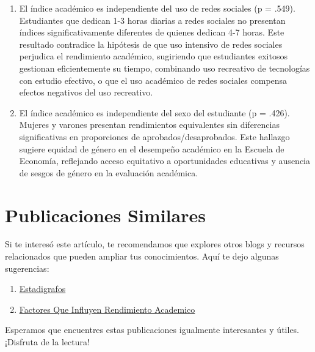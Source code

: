 \documentclass[
  stu,
  floatsintext,
  longtable,
  a4paper,
  nolmodern,
  notxfonts,
  notimes,
  12pt,
  colorlinks=true,linkcolor=blue,citecolor=blue,urlcolor=blue]{apa7}
\providecommand{\tightlist}{%
  \setlength{\itemsep}{0pt}\setlength{\parskip}{0pt}}
\begin{document}
\begin{enumerate}
  trayectorias exitosas.
\item
  El índice académico es independiente del uso de redes sociales (p =
  .549). Estudiantes que dedican 1-3 horas diarias a redes sociales no
  presentan índices significativamente diferentes de quienes dedican 4-7
  horas. Este resultado contradice la hipótesis de que uso intensivo de
  redes sociales perjudica el rendimiento académico, sugiriendo que
  estudiantes exitosos gestionan eficientemente su tiempo, combinando
  uso recreativo de tecnologías con estudio efectivo, o que el uso
  académico de redes sociales compensa efectos negativos del uso
  recreativo.
\item
  El índice académico es independiente del sexo del estudiante (p =
  .426). Mujeres y varones presentan rendimientos equivalentes sin
  diferencias significativas en proporciones de aprobados/desaprobados.
  Este hallazgo sugiere equidad de género en el desempeño académico en
  la Escuela de Economía, reflejando acceso equitativo a oportunidades
  educativas y ausencia de sesgos de género en la evaluación académica.
\end{enumerate}

\section{Publicaciones Similares}\label{publicaciones-similares}

Si te interesó este artículo, te recomendamos que explores otros blogs y
recursos relacionados que pueden ampliar tus conocimientos. Aquí te dejo
algunas sugerencias:

\begin{enumerate}
\def\labelenumi{\arabic{enumi}.}
\tightlist
\item
  \href{https://epsilon-y-beta.netlify.app/estadistica/2018-05-16-estadigrafos/index.pdf}{}
  \href{https://epsilon-y-beta.netlify.app/estadistica/2018-05-16-estadigrafos}{Estadigrafos}
\item
  \href{https://epsilon-y-beta.netlify.app/estadistica/2018-12-26-factores-que-influyen-rendimiento-academico/index.pdf}{}
  \href{https://epsilon-y-beta.netlify.app/estadistica/2018-12-26-factores-que-influyen-rendimiento-academico}{Factores
  Que Influyen Rendimiento Academico}
\end{enumerate}

Esperamos que encuentres estas publicaciones igualmente interesantes y
útiles. ¡Disfruta de la lectura!
\end{document}
